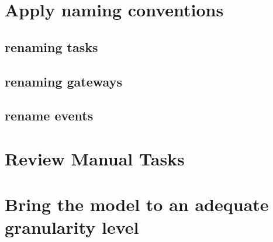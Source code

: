 \section{Apply naming conventions}
\subsection{renaming tasks}
\subsection{renaming gateways}
\subsection{rename events}

\section{Review Manual Tasks}
\section{Bring the model to an adequate granularity level}
